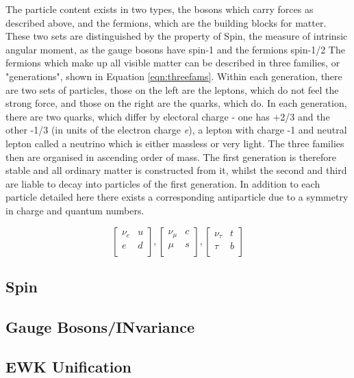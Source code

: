  The particle content exists in two types, the bosons which carry forces as described above, and the fermions, which are the building blocks for matter. These two sets are distinguished by the property of Spin, the measure of intrinsic angular moment, as the gauge bosons have spin-1 and the fermions spin-1/2
The fermions which make up all visible matter can be described in three families, or "generations", shown in Equation \ref{eqn:threefams}. Within each generation, there are two sets of particles, those on the left are the leptons, which do not feel the strong force, and those on the right are the quarks, which do. In each generation, there are two quarks, which differ by electoral charge - one has +2/3 and the other -1/3 (in units of the electron charge \textit{e}), a lepton with charge -1 and neutral lepton called a neutrino which is either massless or very light. The three families then are organised in ascending order of mass. The first generation is therefore stable and all ordinary matter is constructed from it, whilst the second and third are liable to decay into particles of the first generation. In addition to each particle detailed here there exists a corresponding antiparticle due to a symmetry in charge and quantum numbers.  

\begin{equation}
\begin{bmatrix}
\nu_{e} & u \\
e & d \\
\end{bmatrix},
\begin{bmatrix}
\nu_{\mu} & c \\
\mu & s \\
\end{bmatrix},
\begin{bmatrix}
\nu_{\tau} & t \\
\tau & b\\
\end{bmatrix}
\label{eqn:threefams}
\end{equation}

\subsection{Spin}
\subsection{Gauge Bosons/INvariance}
\subsection{EWK Unification}
